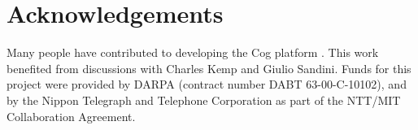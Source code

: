 
\section*{Acknowledgements}

Many people have contributed to developing the Cog platform
\cite{brooks99cog}.  This work benefited from discussions with Charles Kemp
and Giulio Sandini.  Funds for this project were provided by DARPA 
(contract number DABT 63-00-C-10102), and by the
Nippon Telegraph and Telephone Corporation as part of the NTT/MIT
Collaboration Agreement.

